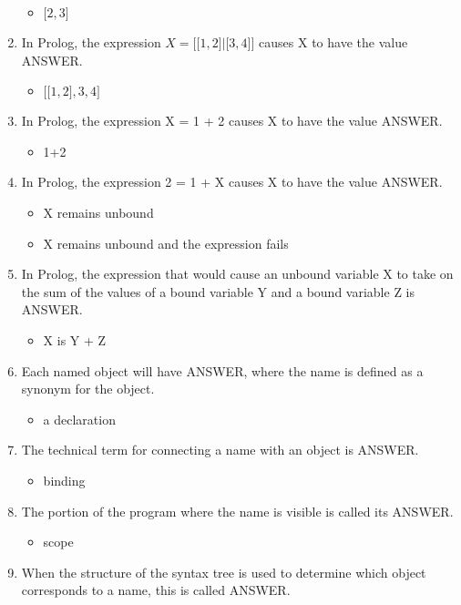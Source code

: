 \documentclass{exam}
\begin{document}
\begin{enumerate}
\begin{itemize}
\item $\lbrack 2, 3\rbrack$
\end{itemize}
\item In Prolog, the expression $X = \lbrack \lbrack 1,2\rbrack | \lbrack 3,4\rbrack \rbrack$ causes X to have the value ANSWER.
\begin{itemize}
\item $\lbrack \lbrack 1, 2\rbrack, 3, 4\rbrack$
\end{itemize}
\item In Prolog, the expression X = 1 + 2 causes X to have the value ANSWER.
\begin{itemize}
\item 1+2
\end{itemize}
\item In Prolog, the expression 2 = 1 + X causes X to have the value ANSWER.
\begin{itemize}
\item X remains unbound
\item X remains unbound and the expression fails
\end{itemize}
\item In Prolog, the expression that would cause an unbound variable X to take on the sum of the values of a bound variable Y and a bound variable Z is ANSWER.
\begin{itemize}
\item X is Y + Z
\end{itemize}
\item Each named object will have ANSWER, where the name is defined as a synonym for the object.
\begin{itemize}
\item a declaration
\end{itemize}
\item The technical term for connecting a name with an object is ANSWER.
\begin{itemize}
\item binding
\end{itemize}
\item The portion of the program where the name is visible is called its ANSWER.
\begin{itemize}
\item scope
\end{itemize}
\item When the structure of the syntax tree is used to determine which object corresponds to a name, this is called ANSWER.

\end{enumerate}
\end{document}
